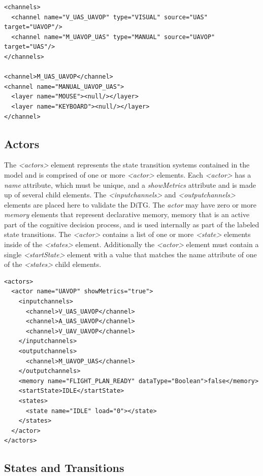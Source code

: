 \begin{lstlisting}[frame=single]
<channels>
  <channel name="V_UAS_UAVOP" type="VISUAL" source="UAS" target="UAVOP"/>
  <channel name="M_UAVOP_UAS" type="MANUAL" source="UAVOP" target="UAS"/>
</channels>

<channel>M_UAS_UAVOP</channel>
<channel name="MANUAL_UAVOP_UAS">
  <layer name="MOUSE"><null/></layer>
  <layer name="KEYBOARD"><null/></layer>
</channel>
\end{lstlisting}


\subsection{Actors}

The {\em \textless actors\textgreater} element represents the state transition systems contained in the model and is comprised of one or more {\em \textless actor\textgreater} elements.  Each {\em \textless actor\textgreater} has a {\em name} attribute, which must be unique, and a {\em showMetrics} attribute and is made up of several child elements.  The {\em \textless inputchannels\textgreater} and {\em \textless outputchannels\textgreater} elements are placed here to validate the DiTG.  The {\em actor} may have zero or more {\em memory} elements that represent declarative memory, memory that is an active part of the cognitive decision process, and is used internally as part of the labeled state transitions.  The {\em \textless actor\textgreater} contains a list of one or more {\em \textless state\textgreater} elements inside of the {\em \textless states\textgreater} element.  Additionally the {\em \textless actor\textgreater} element must contain a single {\em \textless startState\textgreater} element with a value that matches the name attribute of one of the {\em \textless states\textgreater} child elements.

\begin{lstlisting}[frame=single]
<actors>
  <actor name="UAVOP" showMetrics="true">
    <inputchannels>
      <channel>V_UAS_UAVOP</channel>
      <channel>A_UAS_UAVOP</channel>
      <channel>V_UAV_UAVOP</channel>
    </inputchannels>
    <outputchannels>
      <channel>M_UAVOP_UAS</channel>
    </outputchannels>
    <memory name="FLIGHT_PLAN_READY" dataType="Boolean">false</memory>
    <startState>IDLE</startState>
    <states>
      <state name="IDLE" load="0"></state>
    </states>
  </actor>
</actors>
\end{lstlisting}

\subsection{States and Transitions}

